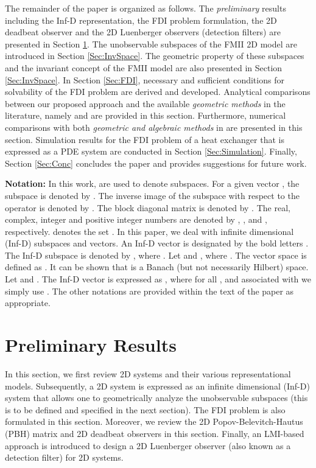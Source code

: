 \documentclass[journal,12pt,draftcls,onecolumn]{IEEEtran}
\begin{document}
The remainder of the paper is organized as follows. The {\it preliminary} results including the Inf-D representation, the FDI problem formulation, the 2D deadbeat observer and the 2D Luenberger observers (detection filters) are presented in Section \ref{Sec:Backgground}. The unobservable subspaces of the FMII 2D model are introduced in Section \ref{Sec:InvSpace}. The geometric property of these subspaces and the invariant concept of the FMII model are also presented in Section \ref{Sec:InvSpace}. In Section \ref{Sec:FDI}, necessary and sufficient conditions for solvability of the FDI problem are derived and developed. Analytical comparisons between our proposed approach and the available \emph{geometric methods} in the literature, namely  \cite{Malek_3DFDI} and \cite{Malek_3DFDIConf} are provided in this section. Furthermore,  numerical comparisons with both \textit{geometric and algebraic methods} in \cite{Malek_3DFDI,Malek_3DFDIConf,BisiaccoMultiDim,BisiaccoLetter} are presented in this section. Simulation results for the FDI problem of a heat exchanger that is expressed as a PDE system are conducted in Section \ref{Sec:Simulation}. Finally, Section \ref{Sec:Conc} concludes the paper and provides suggestions for future work.

{\bf Notation:}
In this work,  are used to denote subspaces. For a given vector , the subspace  is denoted by . The inverse image of the subspace  with respect to the operator  is denoted by . The block diagonal matrix  is denoted by . The real, complex, integer and positive integer numbers are denoted by , ,  and , respectively.  denotes the set . In this paper, we deal with infinite dimensional (Inf-D) subspaces and vectors. An Inf-D vector is designated by the bold letters . The Inf-D subspace  is denoted by , where . Let  and  , where . The vector space  is defined as . It can be shown that  is a Banach (but not necessarily Hilbert) space.  Let  and . The Inf-D vector  is expressed as , where  for all , and associated with  we simply  use . The other notations are provided within the text of the paper as appropriate.
\section{Preliminary Results}\label{Sec:Backgground}
In this section, we first review 2D systems and their various representational models. Subsequently,  a 2D system is expressed as an infinite dimensional (Inf-D) system that allows one to geometrically analyze the unobservable subspaces (this is to be defined and specified in the next section). The FDI problem is also formulated in this section. Moreover, we review the 2D Popov-Belevitch-Hautus (PBH) matrix and 2D deadbeat observers in this section. Finally, an LMI-based approach is introduced to design a 2D Luenberger observer (also known as a detection filter) for 2D systems.
\end{document}
